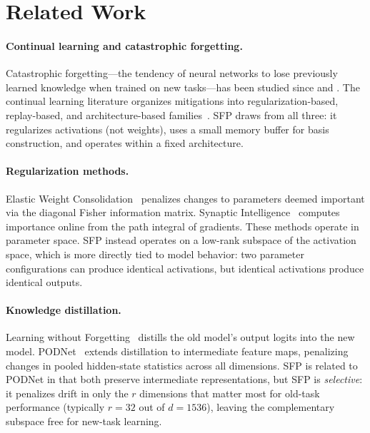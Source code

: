 \section{Related Work}
\label{sec:related}

\paragraph{Continual learning and catastrophic forgetting.}
Catastrophic forgetting---the tendency of neural networks to lose previously learned knowledge when trained on new tasks---has been studied since \citet{mccloskey1989catastrophic} and \citet{french1999catastrophic}.
The continual learning literature organizes mitigations into regularization-based, replay-based, and architecture-based families~\citep{delange2021continual}.
SFP draws from all three: it regularizes activations (not weights), uses a small memory buffer for basis construction, and operates within a fixed architecture.

\paragraph{Regularization methods.}
Elastic Weight Consolidation~\citep[EWC;][]{kirkpatrick2017overcoming} penalizes changes to parameters deemed important via the diagonal Fisher information matrix.
Synaptic Intelligence~\citep{zenke2017continual} computes importance online from the path integral of gradients.
These methods operate in parameter space.
SFP instead operates on a low-rank subspace of the activation space, which is more directly tied to model behavior: two parameter configurations can produce identical activations, but identical activations produce identical outputs.

\paragraph{Knowledge distillation.}
Learning without Forgetting~\citep[LwF;][]{li2017learning} distills the old model's output logits into the new model.
PODNet~\citep{douillard2020podnet} extends distillation to intermediate feature maps, penalizing changes in pooled hidden-state statistics across all dimensions.
SFP is related to PODNet in that both preserve intermediate representations, but SFP is \emph{selective}: it penalizes drift in only the $r$ dimensions that matter most for old-task performance (typically $r = 32$ out of $d = 1536$), leaving the complementary subspace free for new-task learning.

